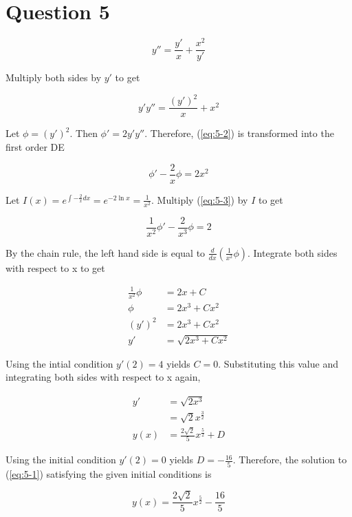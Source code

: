 \documentclass{article}
\begin{document}
\section*{Question 5}

\begin{equation} \label{eq:5-1}
    y'' = \frac{y'}{x} + \frac{x^2}{y'}
\end{equation}

Multiply both sides by $y'$ to get

\begin{equation} \label{eq:5-2}
    y'y'' = \frac{(y')^2}{x} + x^2
\end{equation}

Let $\phi = (y')^2$. Then $\phi' = 2y'y''$. Therefore, (\ref{eq:5-2}) is transformed into the first order DE

\begin{equation} \label{eq:5-3}
    \phi' - \frac{2}{x}\phi = 2x^2
\end{equation}

Let $I(x) = e^{\int -\frac{2}{x} dx} = e^{-2\ln x} = \frac{1}{x^2}$. Multiply (\ref{eq:5-3}) by $I$ to get

\begin{equation} \label{eq:5-4}
    \frac{1}{x^2}\phi' - \frac{2}{x^3}\phi = 2
\end{equation}

By the chain rule, the left hand side is equal to $\frac{d}{dx}\left(\frac{1}{x^2}\phi\right)$. Integrate both sides with respect
to x to get

\begin{align}
    \frac{1}{x^2}\phi &= 2x + C\nonumber\\
    \phi &= 2x^3 + Cx^2\nonumber\\
    (y')^2 &= 2x^3 + Cx^2\nonumber\\
    y' &= \sqrt{2x^3 + Cx^2} \label{eq:5-5}
\end{align}

Using the intial condition $y'(2) = 4$ yields $C = 0$. Substituting this value and integrating both sides with respect to x
again,

\begin{align}
    y' &= \sqrt{2x^3}\nonumber\\
    &= \sqrt{2}x^{\frac{3}{2}}\nonumber\\
    y(x) &= \frac{2\sqrt{2}}{5}x^{\frac{5}{2}} + D \label{eq:5-6}
\end{align}

Using the initial condition $y'(2) = 0$ yields $D = -\frac{16}{5}$. Therefore, the solution to (\ref{eq:5-1}) satisfying the given
initial conditions is

\begin{equation*}
    y(x) = \frac{2\sqrt{2}}{5}x^\frac{5}{2} - \frac{16}{5}
\end{equation*}
\end{document}
